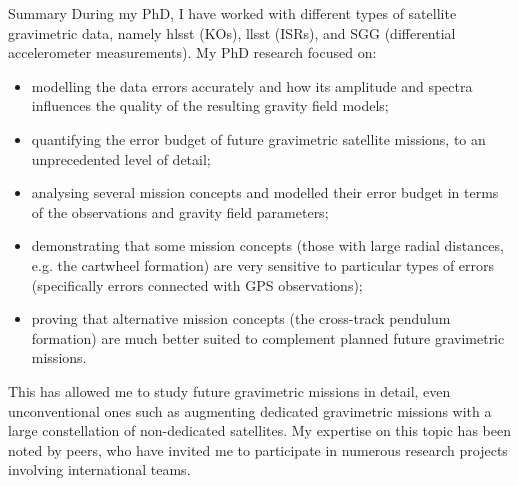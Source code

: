 \begin{cvtext}{Summary}
During my PhD, I have worked with different types of satellite gravimetric data, namely \acl{hlsst} (\aclp{KO}), \acl{llsst} (\aclp{ISR}), and \acl{SGG} (differential accelerometer measurements).
My PhD research focused on:
\begin{itemize}[topsep=0pt,itemsep=1pt,parsep=0pt,partopsep=0pt]
\item modelling the data errors accurately and how its amplitude and spectra influences the quality of the resulting gravity field models;
\item quantifying the error budget of future gravimetric satellite missions, to an unprecedented level of detail;
\item analysing several mission concepts and modelled their error budget in terms of the observations and gravity field parameters;
\item demonstrating that some mission concepts (those with large radial distances, \acs{e.g.} the cartwheel formation) are very sensitive to particular types of errors (specifically errors connected with \ac{GPS} observations); %
\item proving that alternative mission concepts (the cross-track pendulum formation) are much better suited to complement planned future gravimetric missions.%
\end{itemize}
This has allowed me to study future gravimetric missions in detail, even unconventional ones such as augmenting dedicated gravimetric missions with a large constellation of non-dedicated satellites.
My expertise on this topic has been noted by peers, who have invited me to participate in numerous research projects involving international teams.




\end{cvtext}

